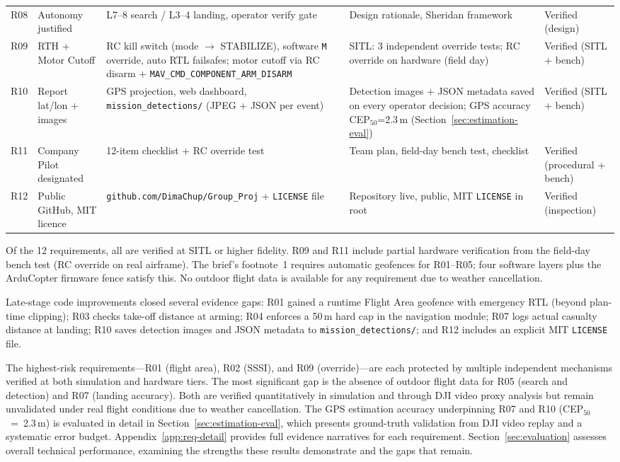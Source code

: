 \begin{table}[htbp]
\begin{tabular}{p{0.55cm}p{1.9cm}p{3.0cm}p{4.0cm}p{2.4cm}}
R08 & Autonomy justified & L7--8 search / L3--4 landing, operator verify gate & Design rationale, Sheridan framework & Verified (design) \\
R09 & RTH + Motor Cutoff & RC kill switch (mode $\to$ STABILIZE), software \texttt{M} override, auto RTL failsafes; motor cutoff via RC disarm + \texttt{MAV\_CMD\_COMPONENT\_ARM\_DISARM} & SITL: 3 independent override tests; RC override on hardware (field day) & Verified (SITL + bench) \\
R10 & Report lat/lon + images & GPS projection, web dashboard, \texttt{mission\_detections/} (JPEG + JSON per event) & Detection images + JSON metadata saved on every operator decision; GPS accuracy CEP$_{50}$=2.3\,m (Section~\ref{sec:estimation-eval}) & Verified (SITL + bench) \\
R11 & Company Pilot designated & 12-item checklist + RC override test & Team plan, field-day bench test, checklist & Verified (procedural + bench) \\
R12 & Public GitHub, MIT licence & \texttt{github.com/DimaChup/Group\_Proj} + \texttt{LICENSE} file & Repository live, public, MIT \texttt{LICENSE} in root & Verified (inspection) \\
\bottomrule
\end{tabular}
\end{table}

Of the 12 requirements, all are verified at SITL or higher fidelity. R09 and R11 include partial hardware verification from the field-day bench test (RC override on real airframe). The brief's footnote~1 requires automatic geofences for R01--R05; four software layers plus the ArduCopter firmware fence satisfy this. No outdoor flight data is available for any requirement due to weather cancellation.

Late-stage code improvements closed several evidence gaps: R01 gained a runtime Flight Area geofence with emergency RTL (beyond plan-time clipping); R03 checks take-off distance at arming; R04 enforces a 50\,m hard cap in the navigation module; R07 logs actual casualty distance at landing; R10 saves detection images and JSON metadata to \texttt{mission\_detections/}; and R12 includes an explicit MIT \texttt{LICENSE} file.

The highest-risk requirements---R01 (flight area), R02 (SSSI), and R09 (override)---are each protected by multiple independent mechanisms verified at both simulation and hardware tiers. The most significant gap is the absence of outdoor flight data for R05 (search and detection) and R07 (landing accuracy). Both are verified quantitatively in simulation and through DJI video proxy analysis but remain unvalidated under real flight conditions due to weather cancellation. The GPS estimation accuracy underpinning R07 and R10 (CEP$_{50}$~=~2.3\,m) is evaluated in detail in Section~\ref{sec:estimation-eval}, which presents ground-truth validation from DJI video replay and a systematic error budget. Appendix~\ref{app:req-detail} provides full evidence narratives for each requirement. Section~\ref{sec:evaluation} assesses overall technical performance, examining the strengths these results demonstrate and the gaps that remain.
